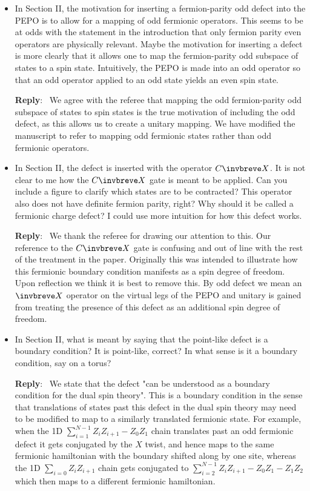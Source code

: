 \documentclass[aps,prx,floatfix,10pt,amssymb,amsfont,amsmath,superscriptaddress,float,nofootinbib,longbibliography,nobalancelastpage]{revtex4-2}
\newenvironment{reply}
   {\medskip \noindent \begin{sf}\textbf{Reply}:\ \color{blue}  }
   {\medskip \end{sf}}
\begin{document}
\begin{itemize}
\item In Section II, the motivation for inserting a fermion-parity odd defect into the PEPO is to allow for a mapping of odd fermionic operators. This seems to be at odds with the statement in the introduction that only fermion parity even operators are physically relevant. Maybe the motivation for inserting a defect is more clearly that it allows one to map the fermion-parity odd subspace of states to a spin state. Intuitively, the PEPO is made into an odd operator so that an odd operator applied to an odd state yields an even spin state.

\begin{reply}
    We agree with the referee that mapping the odd fermion-parity odd subspace of states to spin states is the true motivation of including the odd defect, as this allows us to create a unitary mapping. We have modified the manuscript to refer to mapping odd fermionic states rather than odd fermionic operators.
\end{reply}

\item In Section II, the defect is inserted with the operator $C\invbreve X$. It is not clear to me how the $C\invbreve X$ gate is meant to be applied. Can you include a figure to clarify which states are to be contracted? This operator also does not have definite fermion parity, right? Why should it be called a fermionic charge defect? I could use more intuition for how this defect works.

\begin{reply}
    We thank the referee for drawing our attention to this. Our reference to the $C\invbreve X$ gate is confusing and out of line with the rest of the treatment in the paper. Originally this was intended to illustrate how this fermionic boundary condition manifests as a spin degree of freedom. Upon reflection we think it is best to remove this. By odd defect we mean an $\invbreve X$ operator on the virtual legs of the PEPO and unitary is gained from treating the presence of this defect as an additional spin degree of freedom.
\end{reply}

\item In Section II, what is meant by saying that the point-like defect is a boundary condition? It is point-like, correct? In what sense is it a boundary condition, say on a torus?

\begin{reply}
    We state that the defect "can be understood as a boundary condition for the dual spin theory". This is a boundary condition in the sense that translations of states past this defect in the dual spin theory may need to be modified to map to a similarly translated fermionic state. For example, when the 1D $\sum_{i=1}^{N-1} Z_i Z_{i+1} - Z_0Z_1$ chain translates past an odd fermionic defect it gets conjugated by the $X$ twist, and hence maps to the same fermionic hamiltonian with the boundary shifted along by one site, whereas the 1D $\sum_{i=0} Z_i Z_{i+1}$ chain gets conjugated to $\sum_{i=2}^{N-1} Z_i Z_{i+1} - Z_0Z_1 - Z_{1}Z_2$ which then maps to a different fermionic hamiltonian.


\end{reply}
\end{itemize}
\end{document}

